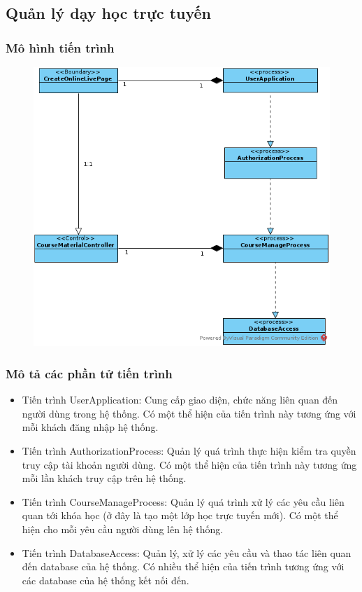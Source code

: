 \documentclass[./../main_file.tex]{subfiles}
\begin{document}
\subsection{Quản lý dạy học trực tuyến}

\subsubsection{Mô hình tiến trình}

\begin{figure}[H]
	\centering
	\includegraphics[width=\linewidth]{./images/pv_create_online_live.png}
\end{figure}

\subsubsection{Mô tả các phần tử tiến trình}
\begin{itemize}
	\item Tiến trình UserApplication: Cung cấp giao diện, chức năng liên quan đến người dùng trong hệ thống. Có một thể hiện của tiến trình này tương ứng với mỗi khách đăng nhập hệ thống.
	\item Tiến trình AuthorizationProcess: Quản lý quá trình thực hiện kiểm tra quyền truy cập tài khoản người dùng.
	Có một thể hiện của tiến trình này tương ứng mỗi lần khách truy cập trên hệ thống.
\item Tiến trình CourseManageProcess: Quản lý quá trình xử lý các yêu cầu liên quan tới khóa học (ở đây là tạo một lớp học trực tuyến mới).
	Có một thể hiện cho mỗi yêu cầu người dùng lên hệ thống.
	\item Tiến trình DatabaseAccess: Quản lý, xử lý các yêu cầu và thao tác liên quan đến  database của hệ thống. Có nhiều thể hiện của tiến trình tương ứng với các database của hệ thống kết nối đến.
\end{itemize}
\end{document}
